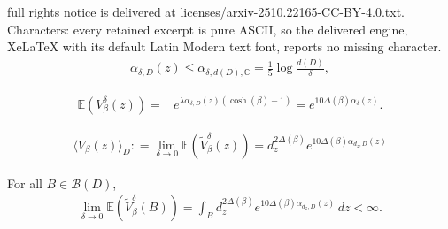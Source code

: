\documentclass[10pt,a4paper]{amsart}
\newcommand{\C}{\mathbb{C}}
\newcommand{\E}{\mathbb{E}}
\newcommand{\mc}{\mathcal}
\begin{document}
full rights notice is delivered at licenses/arxiv-2510.22165-CC-BY-4.0.txt. Characters: every retained excerpt is pure ASCII, so the delivered engine, XeLaTeX with its default Latin Modern text font, reports no missing character.
    \begin{align}\label{eq:mu_D_size}
        \alpha_{\delta, D}(z) \le \alpha_{\delta, d(D), \C } = \frac{1}{5} \log \frac{d(D)}{\delta},
    \end{align}

			\begin{align}\label{eq:1_point_0}
				\E (V^{\delta}_{\beta}(z)) = & e^{\lambda  \alpha_{\delta, D} (z) (\cosh(\beta) -1) }= e^{10\Delta(\beta) \alpha_{\delta}(z)}.
			\end{align}

			\begin{align}\label{eq:conv_1_pt_0}
				\langle V_{\beta}(z) \rangle_D : = \lim_{\delta \to 0}\E (\tilde{V}^{\delta}_{\beta}(z)) = d_z^{2\Delta(\beta)} e^{10\Delta(\beta) \alpha_{d_z, D}(z)}
			\end{align}

	\begin{lem}\label{lem:mean_conv}
		For all $B \in \mc{B}(D)$, 
		\begin{align}\label{eq:mean_conv}
			\lim_{\delta \to 0} \E (\tilde{V}^{\delta}_{\beta}(B)) = \int_B d_z^{2\Delta(\beta)} e^{10\Delta(\beta) \alpha_{d_z, D}(z)} \, dz <\infty.
		\end{align} 
	\end{lem}
\end{document}
